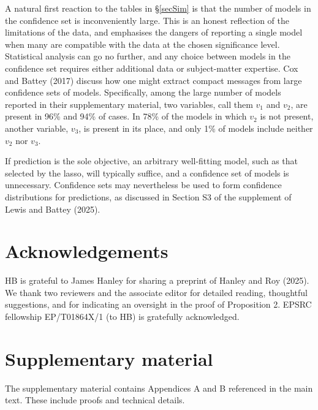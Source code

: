 \documentclass[10pt, reqno]{amsart}
\numberwithin{equation}{section}
\begin{document}
A natural first reaction to the tables in \S \ref{secSim} is that the number of models in the confidence set is inconveniently large. This is an honest reflection of the limitations of the data, and emphasises the dangers of reporting a single model when many are compatible with the data at the chosen significance level. Statistical analysis can go no further, and any choice between models in the confidence set requires either additional data or subject-matter expertise. Cox and Battey (2017) discuss how one might extract compact messages from large confidence sets of models. Specifically, among the large number of models reported in their supplementary material, two variables, call them $v_1$ and $v_2$, are present in 96\% and 94\% of cases. In 78\% of the models in which $v_2$ is not present, another variable, $v_3$, is present in its place, and only 1\% of models include neither $v_2$ nor $v_3$.

If prediction is the sole objective, an arbitrary well-fitting model, such as that selected by the lasso, will typically suffice, and a confidence set of models is unnecessary. Confidence sets may nevertheless be used to form confidence distributions for predictions, as discussed in Section S3 of the supplement of Lewis and Battey (2025).



\section*{Acknowledgements}

HB is grateful to James Hanley for sharing a preprint of Hanley and Roy (2025). We thank two reviewers and the associate editor for detailed reading, thoughtful suggestions, and for indicating an oversight in the proof of Proposition 2. EPSRC fellowship EP/T01864X/1 (to HB) is gratefully acknowledged.

\section*{Supplementary material}

The supplementary material contains Appendices A and B referenced in the main text. These include proofs and technical details.
\end{document}

